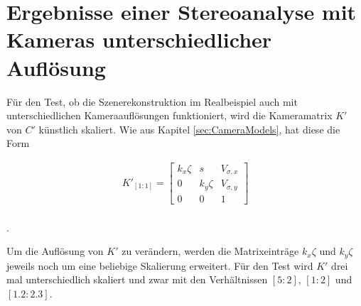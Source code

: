 \label{sec:realAuf} 

\section{Ergebnisse einer Stereoanalyse mit Kameras unterschiedlicher Auflösung}

Für den Test, ob die Szenerekonstruktion im Realbeispiel auch mit unterschiedlichen Kameraauflösungen funktioniert, wird die Kameramatrix $K'$ von $C'$ künstlich skaliert. Wie aus Kapitel \ref{sec:CameraModels}, hat diese die Form



\begin{gather}
K'_{[1:1]}=\begin{bmatrix}
k_x\zeta&s&V_{\sigma,x}\\
0&k_y\zeta&V_{\sigma,y}\\
0&0&1
\end{bmatrix}
\end{gather} \\
.


Um die Auflösung von $K'$ zu verändern, werden die Matrixeinträge $k_x \zeta$ und $k_y \zeta$ jeweils noch um eine beliebige Skalierung erweitert. Für den Test wird $K'$ drei mal unterschiedlich skaliert und zwar mit den Verhältnissen $[5:2],\, [1:2]$ und $[1.2:2.3]$.  


